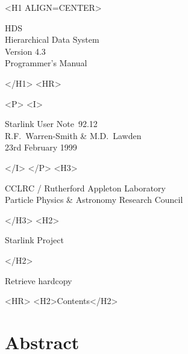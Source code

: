 \documentclass[twoside,11pt]{article}
\newcommand{\stardoccategory}  {Starlink User Note}
\newcommand{\stardocsource}    {sun\stardocnumber}
\newcommand{\stardocnumber}    {92.12}
\newcommand{\stardocauthors}   {R.F.~Warren-Smith \& M.D.~Lawden}
\newcommand{\stardocdate}      {23rd February 1999}
\newcommand{\stardoctitle}     {HDS\\ [\latex{1ex}]
                                Hierarchical Data System}
\newcommand{\stardocversion}   {Version 4.3}
\newcommand{\stardocmanual}    {Programmer's Manual}
\newcommand{\htmladdnormallink}[2]{#1}
\newcommand{\htmladdimg}[1]{}
\newcommand{\htmlref}[2]{#1}
\newcommand{\htmladdtonavigation}[1]{}
\newcommand{\latex}[1]{#1}
\newcommand{\xlabel}[1]{}
\renewcommand{\_}{\texttt{\symbol{95}}}
\begin{document}
\begin{htmlonly}
   \xlabel{}
   \begin{rawhtml} <H1 ALIGN=CENTER> \end{rawhtml}
      \stardoctitle\\
      \stardocversion\\
      \stardocmanual
   \begin{rawhtml} </H1> <HR> \end{rawhtml}


   \begin{rawhtml} <P> <I> \end{rawhtml}
   \stardoccategory\ \stardocnumber \\
   \stardocauthors \\
   \stardocdate
   \begin{rawhtml} </I> </P> <H3> \end{rawhtml}
      \htmladdnormallink{CCLRC / Rutherford Appleton Laboratory}
                        {http://www.cclrc.ac.uk} \\
      \htmladdnormallink{Particle Physics \& Astronomy Research Council}
                        {http://www.pparc.ac.uk} \\
   \begin{rawhtml} </H3> <H2> \end{rawhtml}
      \htmladdnormallink{Starlink Project}{http://www.starlink.rl.ac.uk/}
   \begin{rawhtml} </H2> \end{rawhtml}
   \htmladdnormallink{\htmladdimg{source.gif} Retrieve hardcopy}
      {http://www.starlink.rl.ac.uk/cgi-bin/hcserver?\stardocsource}\\

  \label{stardoccontents}
  \begin{rawhtml} 
    <HR>
    <H2>Contents</H2>
  \end{rawhtml}
  \htmladdtonavigation{\htmlref{\htmladdimg{contents_motif.gif}}
        {stardoccontents}}

  \section{\xlabel{abstract}Abstract}
\end{htmlonly}
\end{document}

